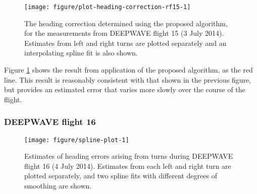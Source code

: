 \documentclass[english,british,amt,bookmarks=false,unicode=true]{copernicus}\usepackage[]{graphicx}\usepackage[]{color}
\makeatletter
\def\maxwidth{ %
  \ifdim\Gin@nat@width>\linewidth
    \linewidth
  \else
    \Gin@nat@width
  \fi
}
\newenvironment{knitrout}{}{} %
\makeatother
\begin{document}
\begin{knitrout}
\color{fgcolor}\begin{figure}
\texttt{[image: figure/plot-heading-correction-rf15-1]} \caption[The heading correction determined using the proposed algorithm, for the measurements from DEEPWAVE flight 15 (3 July 2014)]{The heading correction determined using the proposed algorithm, for the measurements from DEEPWAVE flight 15 (3 July 2014). Estimates from left and right turns are plotted separately and an interpolating spline fit is also shown.}\label{fig:plot-heading-correction-rf15}
\end{figure}


\end{knitrout}

Figure \ref{fig:plot-heading-correction-rf15} shows the result from
application of the proposed algorithm, as the red line. This result
is reasonably consistent with that shown in the previous figure, but
provides an estimated error that varies more slowly over the course
of the flight.


\subsubsection{DEEPWAVE flight 16}





\begin{knitrout}
\color{fgcolor}\begin{figure}
\texttt{[image: figure/spline-plot-1]} \caption[Estimates of heading errors arising from turns during DEEPWAVE flight 16 (4 July 2014)]{Estimates of heading errors arising from turns during DEEPWAVE flight 16 (4 July 2014). Estimates from each left and right turn are plotted separately, and two spline fits with different degrees of smoothing are shown.}\label{fig:spline-plot}
\end{figure}


\end{knitrout}
\end{document}
